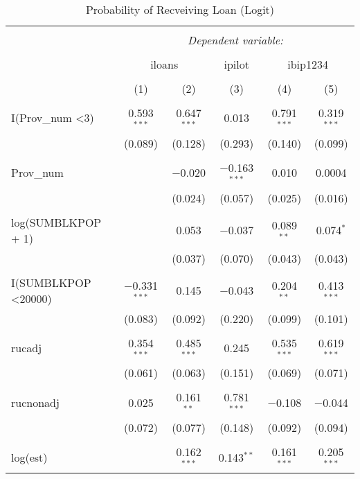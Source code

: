 
\begin{table}[!htbp] \centering 
  \caption{Probability of Recveiving Loan (Logit)} 
  \label{} 
\begin{tabular}{@{\extracolsep{5pt}}lccccc} 
\\[-1.8ex]\hline 
\hline \\[-1.8ex] 
 & \multicolumn{5}{c}{\textit{Dependent variable:}} \\ 
\cline{2-6} 
\\[-1.8ex] & \multicolumn{2}{c}{iloans} & ipilot & \multicolumn{2}{c}{ibip1234} \\ 
\\[-1.8ex] & (1) & (2) & (3) & (4) & (5)\\ 
\hline \\[-1.8ex] 
 I(Prov\_num \textless  3) & 0.593$^{***}$ & 0.647$^{***}$ & 0.013 & 0.791$^{***}$ & 0.319$^{***}$ \\ 
  & (0.089) & (0.128) & (0.293) & (0.140) & (0.099) \\ 
  & & & & & \\ 
 Prov\_num &  & $-$0.020 & $-$0.163$^{***}$ & 0.010 & 0.0004 \\ 
  &  & (0.024) & (0.057) & (0.025) & (0.016) \\ 
  & & & & & \\ 
 log(SUMBLKPOP + 1) &  & 0.053 & $-$0.037 & 0.089$^{**}$ & 0.074$^{*}$ \\ 
  &  & (0.037) & (0.070) & (0.043) & (0.043) \\ 
  & & & & & \\ 
 I(SUMBLKPOP \textless  20000) & $-$0.331$^{***}$ & 0.145 & $-$0.043 & 0.204$^{**}$ & 0.413$^{***}$ \\ 
  & (0.083) & (0.092) & (0.220) & (0.099) & (0.101) \\ 
  & & & & & \\ 
 rucadj & 0.354$^{***}$ & 0.485$^{***}$ & 0.245 & 0.535$^{***}$ & 0.619$^{***}$ \\ 
  & (0.061) & (0.063) & (0.151) & (0.069) & (0.071) \\ 
  & & & & & \\ 
 rucnonadj & 0.025 & 0.161$^{**}$ & 0.781$^{***}$ & $-$0.108 & $-$0.044 \\ 
  & (0.072) & (0.077) & (0.148) & (0.092) & (0.094) \\ 
  & & & & & \\ 
 log(est) &  & 0.162$^{***}$ & 0.143$^{**}$ & 0.161$^{***}$ & 0.205$^{***}$ \\ 

\end{tabular}
\end{table}
